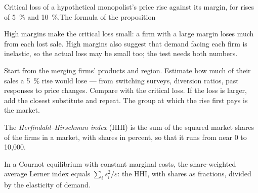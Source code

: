 \begin{omchart}{Critical loss of a hypothetical monopolist's price rise against its
margin, for rises of 5~\% and 10~\%.}{The formula of the proposition}
\end{omchart}

High margins make the critical loss small: a firm with a large margin loses much
from each lost sale. High margins also suggest that demand facing each firm is
inelastic, so the actual loss may be small too; the test needs both numbers.

\begin{measure}
Start from the merging firms' products and region. Estimate how much of their sales a
5~\% rise would lose --- from switching surveys, diversion ratios, past responses to
price changes. Compare with the critical loss. If the loss is larger, add the closest
substitute and repeat. The group at which the rise first pays is the market.
\end{measure}

\begin{definition}\label{def:b3:competition-policy:hhi}
The \emph{Herfindahl--Hirschman index} (HHI) is the sum of the squared market shares of
the firms in a market, with shares in percent, so that it runs from near 0 to 10{,}000.
\end{definition}

\begin{proposition}\label{prop:b3:competition-policy:hhi-lerner}
In a Cournot equilibrium with constant marginal costs, the share-weighted average
Lerner index equals $\sum_i s_i^2/\varepsilon$: the HHI, with shares as fractions, divided by the elasticity of demand.
\end{proposition}

